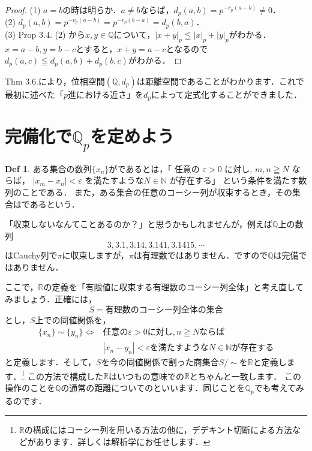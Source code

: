 \documentclass[./main]{subfiles}
\theoremstyle{definition}
\newtheorem{defi}[theo]{Def}
\newcommand{\N}{\mathbb{N}}%
\newcommand{\Q}{\mathbb{Q}}%
\newcommand{\Qp}{\mathbb{Q}_p}%
\newcommand{\R}{\mathbb{R}}%
\newcommand{\abs}[1]{\left\lvert#1\right\rvert}%
\begin{document}
\begin{proof}
	(1) $a=b$の時は明らか．$a \neq b$ならば，$d_p(a,b)=p^{-v_p(a-b)} \neq 0$．\\
	(2) $d_p(a,b)=p^{-v_p(a-b)}=p^{-v_p(b-a)}=d_p(b,a)$．\\
	(3) Prop 3.4. (2) から$x,y \in \Q$について，$\abs{x+y}_p \leqq \abs{x}_p+\abs{y}_p$がわかる．$x=a-b,y=b-c$とすると，$x+y=a-c$となるので$d_p(a,c) \leqq d_p(a,b) +d_p(b,c)$がわかる．
\end{proof}

Thm 3.6.により，位相空間$(\Q,d_p)$は距離空間であることがわかります．これで最初に述べた「$p$進における近さ」を$d_p$によって定式化することができました．


\section{完備化で$\Qp$を定めよう}

\begin{defi}
	ある集合の数列$\{x_n\}$がであるとは，「	任意の $\varepsilon > 0$ に対し, $m,n \geqq N$ ならば，	$\abs{x_m - x_n}<\varepsilon$ を満たすような$N \in \N$ が存在する」	という条件を満たす数列のことである．
	また，ある集合の任意のコーシー列が収束するとき，その集合はであるという．
\end{defi}

「収束しないなんてことあるのか？」と思うかもしれませんが，例えば$\Q$上の数列
\[
3, 3.1, 3.14, 3.141, 3.1415, \cdots
\]
はCauchy列で$\pi$に収束しますが，$\pi$は有理数ではありません．ですので$\Q$は完備ではありません．

ここで，$\R$の定義を「有限値に収束する有理数のコーシー列全体」と考え直してみましょう．正確には，
\[
S=有理数のコーシー列全体の集合
\]
とし，$S$上での同値関係を，
\begin{equation*}
	\begin{split}
	\{x_n\} \sim \{y_n\} \Longleftrightarrow & 任意の \varepsilon > 0 に対し,  n \geqq N ならば \\
	&\abs{x_n - y_n}<\varepsilon を満たすようなN \in \N が存在する
	\end{split}
\end{equation*}
と定義します．そして，$S$を今の同値関係で割った商集合$S/{\sim}$を$\R$と定義します．\footnote{$\R$の構成にはコーシー列を用いる方法の他に，デデキント切断による方法などがあります．詳しくは解析学にお任せします．} この方法で構成した$\R$はいつもの意味での$\R$とちゃんと一致します．
この操作のことを$\Q$の通常の距離についてのといいます．同じことを$\Qp$でも考えてみるのです．
\end{document}
